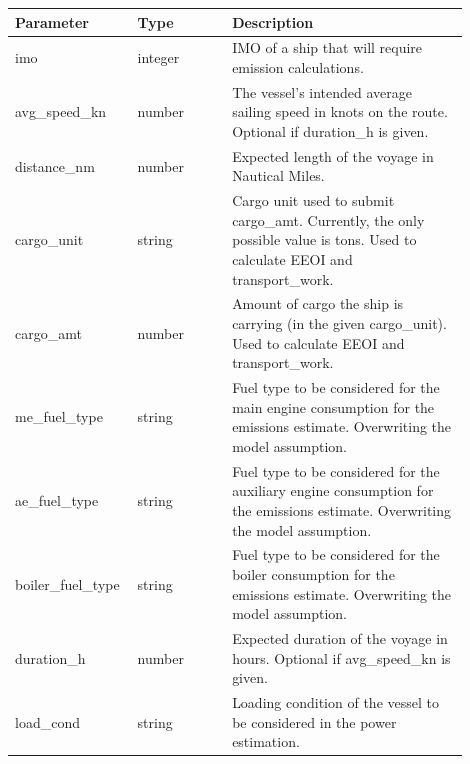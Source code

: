 \begin{table}[h]
    \centering
    \begin{tabular}{|p{0.2\linewidth}|p{0.2\linewidth}|p{0.5\linewidth}|}
        \hline
        \textbf{Parameter}  & \textbf{Type} & \textbf{Description}                                                                                                          \\
        \hline
        imo                 & integer       & IMO of a ship that will require emission calculations.                                                                        \\
        \hline
        avg\_speed\_kn      & number        & The vessel's intended average sailing speed in knots on the route. Optional if duration\_h is given.                          \\
        \hline
        distance\_nm        & number        & Expected length of the voyage in Nautical Miles.                                                                              \\
        \hline
        cargo\_unit         & string        & Cargo unit used to submit cargo\_amt. Currently, the only possible value is tons. Used to calculate EEOI and transport\_work. \\
        \hline
        cargo\_amt          & number        & Amount of cargo the ship is carrying (in the given cargo\_unit). Used to calculate EEOI and transport\_work.                  \\
        \hline
        me\_fuel\_type      & string        & Fuel type to be considered for the main engine consumption for the emissions estimate. Overwriting the model assumption.      \\
        \hline
        ae\_fuel\_type      & string        & Fuel type to be considered for the auxiliary engine consumption for the emissions estimate. Overwriting the model assumption. \\
        \hline
        boiler\_fuel\_type  & string        & Fuel type to be considered for the boiler consumption for the emissions estimate. Overwriting the model assumption.           \\
        \hline
        duration\_h         & number        & Expected duration of the voyage in hours. Optional if avg\_speed\_kn is given.                                                \\
        \hline
        load\_cond          & string        & Loading condition of the vessel to be considered in the power estimation.                                                     \\

\end{tabular}
\end{table}
